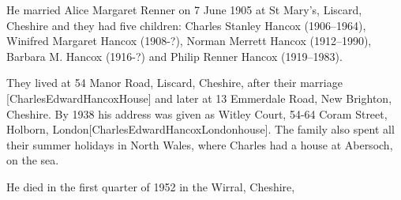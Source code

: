 He married Alice Margaret Renner on 7 June 1905 at St Mary's, Liscard, Cheshire and they had five children:  Charles Stanley Hancox (1906--1964), Winifred Margaret Hancox (1908-?), Norman Merrett Hancox (1912--1990), Barbara M. Hancox (1916-?) and Philip Renner Hancox (1919--1983).

They lived at 54 Manor Road,	Liscard, Cheshire, after their marriage [CharlesEdwardHancoxHouse] and later at 13 Emmerdale Road, New Brighton, Cheshire.  By 1938 his address was given as Witley Court, 54-64 Coram Street, Holborn, London[CharlesEdwardHancoxLondonhouse].  The family also spent all their summer holidays in North Wales, where Charles had a house at Abersoch, on the sea.

He died in the first quarter of 1952 	in the Wirral, Cheshire,

